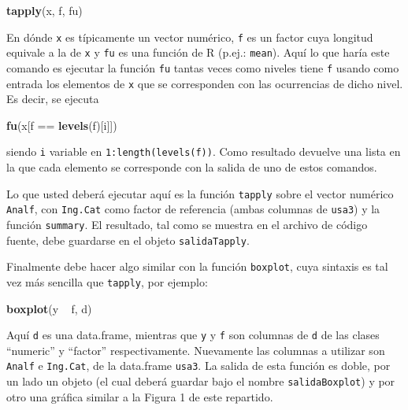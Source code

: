 \documentclass[]{article}
\newenvironment{Shaded}{}{}
\newcommand{\KeywordTok}[1]{\textcolor[rgb]{0.00,0.44,0.13}{\textbf{{#1}}}}
\newcommand{\StringTok}[1]{\textcolor[rgb]{0.25,0.44,0.63}{{#1}}}
\newcommand{\NormalTok}[1]{{#1}}
\begin{document}
\begin{Shaded}
\begin{Highlighting}[]
\KeywordTok{tapply}\NormalTok{(x, f, fu)}
\end{Highlighting}
\end{Shaded}

En dónde \texttt{x} es típicamente un vector numérico, \texttt{f} es un
factor cuya longitud equivale a la de \texttt{x} y \texttt{fu} es una
función de R (p.ej.: \texttt{mean}). Aquí lo que haría este comando es
ejecutar la función \texttt{fu} tantas veces como niveles tiene
\texttt{f} usando como entrada los elementos de \texttt{x} que se
corresponden con las ocurrencias de dicho nivel. Es decir, se ejecuta

\begin{Shaded}
\begin{Highlighting}[]
\KeywordTok{fu}\NormalTok{(x[f ==}\StringTok{ }\KeywordTok{levels}\NormalTok{(f)[i]])}
\end{Highlighting}
\end{Shaded}

siendo \texttt{i} variable en \texttt{1:length(levels(f))}. Como
resultado devuelve una lista en la que cada elemento se corresponde con
la salida de uno de estos comandos.

Lo que usted deberá ejecutar aquí es la función \texttt{tapply} sobre el
vector numérico \texttt{Analf}, con \texttt{Ing.Cat} como factor de
referencia (ambas columnas de \texttt{usa3}) y la función
\texttt{summary}. El resultado, tal como se muestra en el archivo de
código fuente, debe guardarse en el objeto \texttt{salidaTapply}.

Finalmente debe hacer algo similar con la función \texttt{boxplot}, cuya
sintaxis es tal vez más sencilla que \texttt{tapply}, por ejemplo:

\begin{Shaded}
\begin{Highlighting}[]
\KeywordTok{boxplot}\NormalTok{(y ~}\StringTok{ }\NormalTok{f, d)}
\end{Highlighting}
\end{Shaded}

Aquí \texttt{d} es una data.frame, mientras que \texttt{y} y \texttt{f}
son columnas de \texttt{d} de las clases ``numeric'' y ``factor''
respectivamente. Nuevamente las columnas a utilizar son \texttt{Analf} e
\texttt{Ing.Cat}, de la data.frame \texttt{usa3}. La salida de esta
función es doble, por un lado un objeto (el cual deberá guardar bajo el
nombre \texttt{salidaBoxplot}) y por otro una gráfica similar a la
Figura 1 de este repartido.
\end{document}

